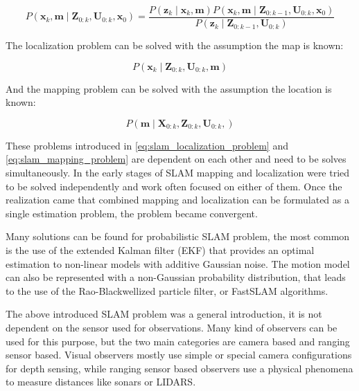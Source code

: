\begin{equation} \label{eq:slam_mesurement_update}
    P\left ( \mathbf{x}_{k}, \mathbf{m} \mid \mathbf{Z}_{0:k}, \mathbf{U}_{0:k}, \mathbf{x}_{0} \right )= 
    \frac
        {P\left ( \mathbf{z}_{k}\mid \mathbf{x}_{k}, \mathbf{m} \right )P\left ( \mathbf{x}_{k}, \mathbf{m}\mid \mathbf{Z}_{0:k-1}, \mathbf{U}_{0:k}, \mathbf{x}_{0}\right ) }
        {P\left ( \mathbf{z}_{k} \mid \mathbf{Z}_{0:k-1}, \mathbf{U}_{0:k}\right )}
\end{equation}


The localization problem can be solved with the assumption the map is known:

\begin{equation} \label{eq:slam_localization_problem}
    P\left ( \mathbf{x}_{k} \mid \mathbf{Z}_{0:k}, \mathbf{U}_{0:k}, \mathbf{m}\right )
\end{equation}

And the mapping problem can be solved with the assumption the location is known:

\begin{equation} \label{eq:slam_mapping_problem}
    P\left ( \mathbf{m} \mid \mathbf{X}_{0:k}, \mathbf{Z}_{0:k}, \mathbf{U}_{0:k}, \right )
\end{equation}

These problems introduced in \ref{eq:slam_localization_problem} and \ref{eq:slam_mapping_problem} are
dependent on each other and need to be solves simultaneously. In the early stages of SLAM mapping and localization
were tried to be solved independently and work often focused on either of them. Once the realization came that combined 
mapping and localization can be formulated as a single estimation problem, the problem became convergent.

Many solutions can be found for probabilistic SLAM problem, the most common is the use of the extended Kalman
filter (EKF) that provides an optimal estimation to non-linear models with additive Gaussian noise. The motion
model can also be represented with a non-Gaussian probability distribution, that leads to the use of the 
Rao-Blackwellized particle filter, or FastSLAM algorithms.


The above introduced SLAM problem was a general introduction, it is not dependent on the sensor used for observations.
Many kind of observers can be used for this purpose, but the two main categories are camera based and ranging sensor based.
Visual observers mostly use simple or special camera configurations for depth sensing, while ranging sensor based observers 
use a physical phenomena to measure distances like sonars or LIDARS.

